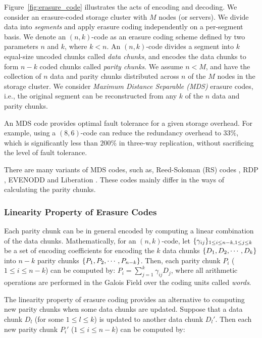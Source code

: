 Figure~\ref{fig:erasure_code} illustrates the acts of encoding and decoding. 
We consider an erasure-coded storage cluster with $M$ nodes (or servers).  We
divide data into {\em segments} and apply erasure coding independently on a
per-segment basis.  We denote an $(n,k)$-code as an erasure coding scheme
defined by two parameters $n$ and $k$, where $k<n$.  An $(n,k)$-code divides a
segment into $k$ equal-size uncoded chunks called {\em data chunks}, and
encodes the data chunks to form $n-k$ coded chunks called {\em parity chunks}.
We assume $n < M$, and have the collection of $n$ data and parity chunks
distributed across $n$ of the $M$ nodes in the storage cluster.  We consider
{\em Maximum Distance Separable (MDS)} erasure codes, i.e., the original segment
can be reconstructed from any $k$ of the $n$ data and parity chunks. 

An MDS code provides optimal fault tolerance for a given storage overhead. For
example, using a $(8,6)$-code can reduce the redundancy overhead to $33\%$,
which is significantly less than $200\%$ in three-way replication, without
sacrificing the level of fault tolerance. 

There are many variants of MDS codes, such as, Reed-Soloman (RS) codes
\cite{reed60}, RDP \cite{corbett04}, EVENODD \cite{plank08} and Liberation
\cite{blaum95}. These codes mainly differ in the ways of calculating the parity chunks.

\subsubsection{Linearity Property of Erasure Codes}

Each parity chunk can be in general encoded by computing a linear combination
of the data chunks.  Mathematically, for an $(n,k)$-code, let
$\lbrace \gamma_{ij} \rbrace_{1\le i\le n-k, 1\le j\le k}$ be a set of encoding
coefficients for encoding the $k$ data chunks $\lbrace D_1, D_2,\cdots,D_k \rbrace$ into
$n-k$ parity chunks $\lbrace P_1,P_2,\cdots,P_{n-k} \rbrace$.  Then, each parity chunk
$P_i$ ($1\le i\le n-k$) can be computed by:
$P_i = \sum_{j=1}^{k} \gamma_{ij} D_j$, 
where all arithmetic operations are performed in the Galois Field over the
coding units called {\em words}. 

The linearity property of erasure coding provides an alternative to computing
new parity chunks when some data chunks are updated.  Suppose that a data
chunk $D_l$ (for some $1\le l\le k$) is updated to another data chunk $D_l'$. 
Then each new parity chunk $P_i'$ ($1\le i\le n-k$) can be computed by:


